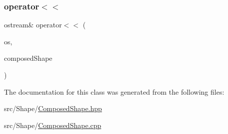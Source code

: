\subsubsection{\texorpdfstring{operator$<$$<$}{operator<<}}
{\footnotesize\ttfamily ostream\& operator$<$$<$ (\begin{DoxyParamCaption}\item[{ostream \&}]{os,  }\item[{const \hyperlink{class_composed_shape}{Composed\+Shape} \&}]{composed\+Shape }\end{DoxyParamCaption})\hspace{0.3cm}{\ttfamily [friend]}}



The documentation for this class was generated from the following files\+:\begin{DoxyCompactItemize}
\item 
src/\+Shape/\hyperlink{_composed_shape_8hpp}{Composed\+Shape.\+hpp}\item 
src/\+Shape/\hyperlink{_composed_shape_8cpp}{Composed\+Shape.\+cpp}\end{DoxyCompactItemize}
